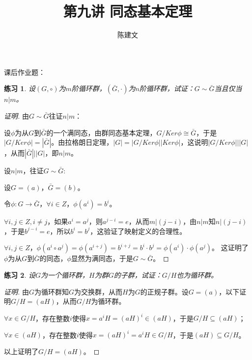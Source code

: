 \documentclass{article}
\newtheorem{Exercise}{练习}
\begin{document}
\begin{CJK*}{UTF8}{gbsn}
  \title{第九讲 同态基本定理}
  \author{陈建文}
  \maketitle
  


课后作业题：
\begin{Exercise}
设$(G,\circ)$为$m$阶循环群，$(\bar{G},\cdot)$为$n$阶循环群，试证：$G \sim \bar{G}$当且仅当$n | m$。
\end{Exercise}
\begin{proof}[证明]
由$G\sim \bar{G}$往证$n|m$：

设$\phi$为从$G$到$\bar{G}$的一个满同态，由群同态基本定理，$G/Ker \phi\cong \bar{G}$，于是$|G/Ker \phi|=|\bar{G}|$。由拉格朗日定理，$|G|=|G/Ker \phi||Ker \phi|$，这说明$|G/Ker \phi|||G|$，从而$|\bar{G}|||G|$，即$n|m$。

设$n|m$，往证$G\sim \bar{G}$:

设$G=(a)$，$\bar{G}=(b)$。

令$\phi:G\to \bar{G}$，$\forall i\in Z$，$\phi(a^i)=b^i$。

$\forall i,j\in Z, i\neq j$，如果$a^i=a^j$，则$a^{j-i}=e$，从而$m|(j-i)$，由$n|m$知$n|(j-i)$，于是$b^{j-i}=e$，所以$b^i=b^j$，这验证了映射定义的合理性。

$\forall i,j\in Z$，$\phi(a^i\circ a^j)=\phi(a^{i+j})=b^{i+j} =b^i\cdot b^j=\phi(a^i)\cdot \phi(a^j)$。 
这证明了$\phi$为从$G$到$\bar{G}$的同态，$\phi$显然为满同态，于是$G\sim \bar{G}$。
\end{proof}
\begin{Exercise}
设$G$为一个循环群，$H$为群$G$的子群，试证：$G/H$也为循环群。
\end{Exercise}
\begin{proof}[证明]
由$G$为循环群知$G$为交换群，从而$H$为$G$的正规子群。设$G=(a)$，以下证明$G/H=(aH)$，从而$G/H$为循环群。

$\forall x\in G/H$，存在整数$i$使得$x=a^iH=(aH)^i\in (aH)$，于是$G/H\subseteq (aH)$；

$\forall x\in (aH)$，存在整数$i$使得$x=(aH)^i=a^iH\in G/H$，于是$(aH)\subseteq G/H$。

以上证明了$G/H=(aH)$。
\end{proof}
\end{CJK*}
\end{document}
